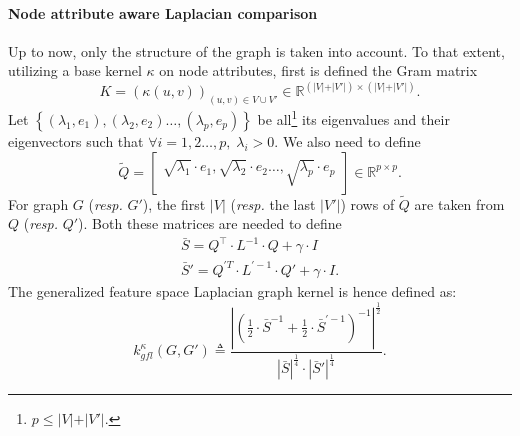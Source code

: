                 \paragraph{Node attribute aware Laplacian comparison}
                    Up to now, only the structure of the graph is taken into account.
                    To that extent, utilizing a base kernel $\kappa$ on node attributes, first is defined the Gram matrix
                    \begin{equation*}
                        K=\left(\kappa\left(u, v\right)\right)_{(u,v) \in V \cup V'} \in \mathbb{R}^{\left(\vert V \vert + \vert V' \vert\right) \times \left(\vert V \vert + \vert V' \vert\right)}.
                    \end{equation*}
                    Let $\left\{ (\lambda_1, e_1), (\lambda_2, e_2)\dots,(\lambda_p, e_p) \right\}$ be all\footnote{$p \leq \vert V \vert + \vert V' \vert$.} its eigenvalues and their eigenvectors such that $\forall i = 1, 2 \dots, p,\; \lambda_i > 0$.
                    We also need to define
                    \begin{equation*}
                        \widetilde{Q} = \begin{bmatrix}
                            \sqrt{\lambda_1}\cdot e_1, \sqrt{\lambda_2}\cdot e_2 \dots, \sqrt{\lambda_p}\cdot e_p
                        \end{bmatrix} \in \mathbb{R}^{p \times p}.
                    \end{equation*}
                    For graph \(G\) (\textit{resp.} \(G'\)), the first $\vert V \vert$ (\textit{resp.} the last $\vert V' \vert$) rows of $\widetilde{Q}$ are taken from $Q$ (\textit{resp.} $Q'$).
                    Both these matrices are needed to define 
                    \begin{align*}
                        \bar{S} = Q^\intercal\cdot L ^{-1}\cdot Q + \gamma \cdot I\\
                        \bar{S}' = Q^{\prime T}\cdot L^{\prime -1}\cdot Q' + \gamma \cdot I.
                    \end{align*}
                    The generalized feature space Laplacian graph kernel is hence defined as:
                    \begin{equation}
                        \label{eq::generalized_feature_laplacian_kernel}
                        k^{\kappa}_{gfl}(G, G') \triangleq \frac{\left\lvert \left(\frac{1}{2} \cdot \bar{S}^{-1} + \frac{1}{2} \cdot \bar{S}^{\prime -1} \right)^{-1} \right\rvert^{\frac{1}{2}}}{\left\lvert \bar{S}\right\rvert^{\frac{1}{4}}\cdot\left\lvert \bar{S}' \right\rvert^{\frac{1}{4}}}.
                    \end{equation}

